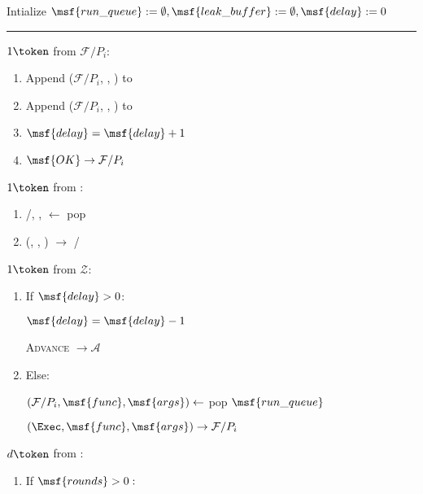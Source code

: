 \begin{bbox}[title={\textbf{Wrapper} $\Wasync$} ] 

Intialize $\msf{run\_queue} := \emptyset, \msf{leak\_buffer} := \emptyset, \msf{delay} := 0$

\vspace{2mm} \hrule \vspace{2mm}

\OnInput {} \color{red} $1 \token$ \color{black} from $\mathcal{F}/P_i$:
	\begin{enumerate}
		\item Append ($\mathcal{F}/P_i$, , ) to 
		\item Append ($\mathcal{F}/P_i$, , ) to 
		\item $\msf{delay} = \msf{delay} + 1$
		\item \Send $\msf{OK} \rightarrow \mathcal{F}/P_i$
	\end{enumerate}


\OnInput {} \color{red} $1 \token$ \color{black} from \Adversary:
	\begin{enumerate}
		\item \F/\Partyi, ,  $\leftarrow$ pop 
		\item \Send (\Exec, , ) $\rightarrow$ \F/\Partyi
	\end{enumerate}

\OnInput {} \color{red} $1 \token$ \color{black} from $\mathcal{Z}$:
	\begin{enumerate}
		\item If $\msf{delay} > 0$:

			\quad  $\msf{delay} = \msf{delay} - 1$

			\quad  \Send \textsc{Advance} $\rightarrow \mathcal{A}$
		\item Else:
			
			\quad $(\mathcal{F}/P_i, \msf{func}, \msf{args}) \leftarrow$ pop $\msf{run\_queue}$

			\quad \Send $(\Exec, \msf{func}, \msf{args}) \rightarrow \mathcal{F}/P_i$
	\end{enumerate}

\OnInput {} \color{red} $d \token$ \color{black} from \Adversary:
	\begin{enumerate}
		\item If $\msf{rounds} > 0:$


\end{enumerate}
\end{bbox}
